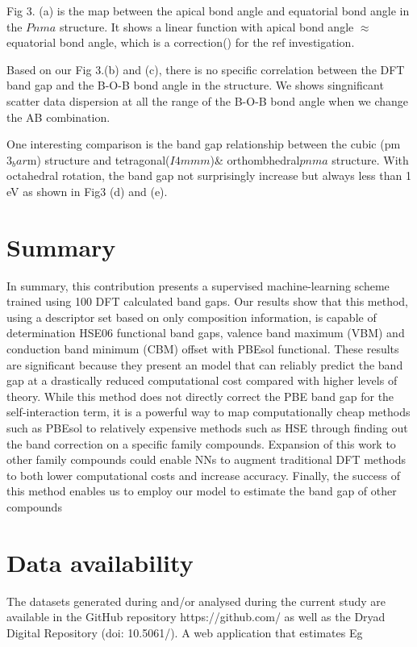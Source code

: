 \documentclass[%
twocolumn,
 amsmath,amssymb,
 aps, citeautoscript,
prb,
]{revtex4-1}
\begin{document}
Fig 3. (a) is the map between the apical bond angle and equatorial bond angle in the $Pnma$ structure. It shows a linear function with apical bond angle $\approx$ equatorial bond angle, which is a correction() for the ref\cite{} investigation. 

Based on our Fig 3.(b) and (c), there is no specific correlation between the DFT band gap and the B-O-B bond angle in the structure. We shows singnificant scatter data dispersion at all the range of the B-O-B bond angle when we change the AB combination. 

One interesting comparison is the band gap relationship between the cubic (pm$3_bar$m) structure and tetragonal($I4mmm$)\& orthombhedral$pnma$ structure. With octahedral rotation, the band gap not surprisingly increase but always less than 1 eV as shown in Fig3 (d) and (e). 

\section{Summary}

In summary, this contribution presents a supervised machine-learning scheme trained using 100 DFT calculated band gaps. Our results show that this method, using a descriptor set based on only composition information, is capable of determination HSE06 functional band gaps, valence band maximum (VBM) and conduction band minimum (CBM) offset with PBEsol functional. 
These results are significant because they present an model that can reliably predict the band gap at a drastically reduced computational cost compared with higher levels of theory.
While this method does not directly correct the PBE band gap for the self-interaction term, it is a powerful way to map computationally cheap methods such as PBEsol to relatively expensive methods such as HSE through finding out the band correction on a specific family compounds. Expansion of this work to other family compounds could enable NNs to augment traditional DFT methods to both lower computational costs and increase accuracy. 
Finally, the success of this method enables us to employ our model to estimate the band gap of other compounds 

\section{Data availability}

The datasets generated during and/or analysed during the current study are available in
the GitHub repository https://github.com/ as well as the
Dryad Digital Repository (doi: 10.5061/). A web application that estimates Eg 
\end{document}
